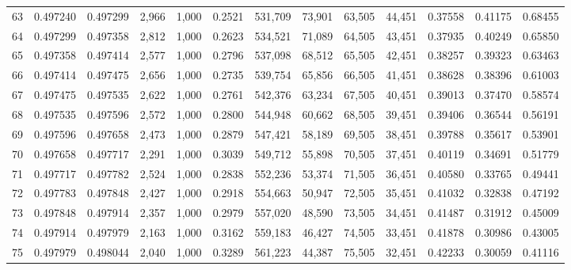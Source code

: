 \begin{tabular}{rrrrrrrrrrrrr}
63  &  0.497240 &  0.497299 &   2,966 &  1,000 &                                     0.2521 &  531,709 &   73,901 &   63,505 &   44,451 &  0.37558 &  0.41175 &  0.68455 \\
64  &  0.497299 &  0.497358 &   2,812 &  1,000 &                                     0.2623 &  534,521 &   71,089 &   64,505 &   43,451 &  0.37935 &  0.40249 &  0.65850 \\
65  &  0.497358 &  0.497414 &   2,577 &  1,000 &                                     0.2796 &  537,098 &   68,512 &   65,505 &   42,451 &  0.38257 &  0.39323 &  0.63463 \\
66  &  0.497414 &  0.497475 &   2,656 &  1,000 &                                     0.2735 &  539,754 &   65,856 &   66,505 &   41,451 &  0.38628 &  0.38396 &  0.61003 \\
67  &  0.497475 &  0.497535 &   2,622 &  1,000 &                                     0.2761 &  542,376 &   63,234 &   67,505 &   40,451 &  0.39013 &  0.37470 &  0.58574 \\
68  &  0.497535 &  0.497596 &   2,572 &  1,000 &                                     0.2800 &  544,948 &   60,662 &   68,505 &   39,451 &  0.39406 &  0.36544 &  0.56191 \\
69  &  0.497596 &  0.497658 &   2,473 &  1,000 &                                     0.2879 &  547,421 &   58,189 &   69,505 &   38,451 &  0.39788 &  0.35617 &  0.53901 \\
70  &  0.497658 &  0.497717 &   2,291 &  1,000 &                                     0.3039 &  549,712 &   55,898 &   70,505 &   37,451 &  0.40119 &  0.34691 &  0.51779 \\
71  &  0.497717 &  0.497782 &   2,524 &  1,000 &                                     0.2838 &  552,236 &   53,374 &   71,505 &   36,451 &  0.40580 &  0.33765 &  0.49441 \\
72  &  0.497783 &  0.497848 &   2,427 &  1,000 &                                     0.2918 &  554,663 &   50,947 &   72,505 &   35,451 &  0.41032 &  0.32838 &  0.47192 \\
73  &  0.497848 &  0.497914 &   2,357 &  1,000 &                                     0.2979 &  557,020 &   48,590 &   73,505 &   34,451 &  0.41487 &  0.31912 &  0.45009 \\
74  &  0.497914 &  0.497979 &   2,163 &  1,000 &                                     0.3162 &  559,183 &   46,427 &   74,505 &   33,451 &  0.41878 &  0.30986 &  0.43005 \\
75  &  0.497979 &  0.498044 &   2,040 &  1,000 &                                     0.3289 &  561,223 &   44,387 &   75,505 &   32,451 &  0.42233 &  0.30059 &  0.41116 \\

\end{tabular}
